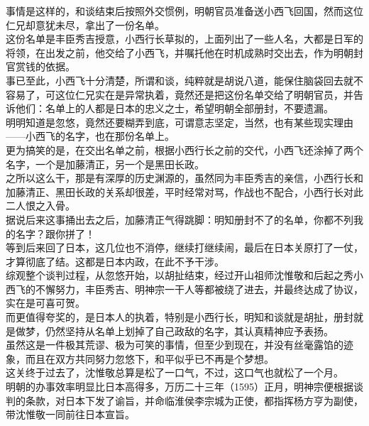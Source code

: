 \begin{multicols}{\theparacolNo}
事情是这样的，和谈结束后按照外交惯例，明朝官员准备送小西飞回国，然而这位仁兄却意犹未尽，拿出了一份名单。\\

这份名单是丰臣秀吉授意，小西行长草拟的，上面列出了一些人名，大都是日军的将领，在出发之前，他交给了小西飞，并嘱托他在时机成熟时交出去，作为明朝封官赏钱的依据。\\

事已至此，小西飞十分清楚，所谓和谈，纯粹就是胡说八道，能保住脑袋回去就不容易了，可这位仁兄实在是异常执着，竟然还是把这份名单交给了明朝官员，并告诉他们：名单上的人都是日本的忠义之士，希望明朝全部册封，不要遗漏。\\

明明知道是忽悠，竟然还要糊弄到底，可谓意志坚定，当然，也有某些现实理由——小西飞的名字，也在那份名单上。\\

更为搞笑的是，在交出名单之前，根据小西行长之前的交代，小西飞还涂掉了两个名字，一个是加藤清正，另一个是黑田长政。\\

之所以这么干，那是有深厚的历史渊源的，虽然同为丰臣秀吉的亲信，小西行长和加藤清正、黑田长政的关系却很差，平时经常对骂，作战也不配合，小西行长对此二人恨之入骨。\\

据说后来这事捅出去之后，加藤清正气得跳脚：明知册封不了的名单，你都不列我的名字？跟你拼了！\\

等到后来回了日本，这几位也不消停，继续打继续闹，最后在日本关原打了一仗，才算彻底了结。这都是日本内政，在此不予干涉。\\

综观整个谈判过程，从忽悠开始，以胡扯结束，经过开山祖师沈惟敬和后起之秀小西飞的不懈努力，丰臣秀吉、明神宗一干人等都被绕了进去，并最终达成了协议，实在是可喜可贺。\\

而更值得夸奖的，是日本人的执着，特别是小西行长，明知和谈就是胡扯，册封就是做梦，仍然坚持从名单上划掉了自己政敌的名字，其认真精神应予表扬。\\

虽然这是一件极其荒谬、极为可笑的事情，但至少到现在，并没有丝毫露馅的迹象，而且在双方共同努力忽悠下，和平似乎已不再是个梦想。\\

这关终于过去了，沈惟敬总算是松了一口气，不过，这口气也就松了一个月。\\

明朝的办事效率明显比日本高得多，万历二十三年（1595）正月，明神宗便根据谈判的条款，对日本下发了谕旨，并命临淮侯李宗城为正使，都指挥杨方亨为副使，带沈惟敬一同前往日本宣旨。\\


\end{multicols}
